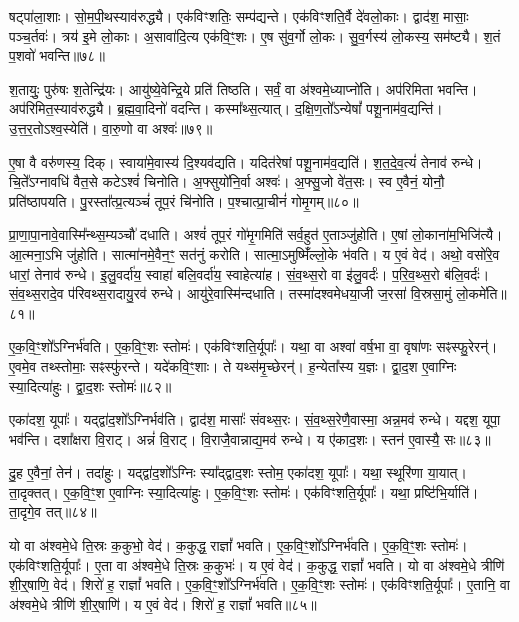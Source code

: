 षट्पा॑ला॒शाः।
सो॒म॒पी॒थस्याव॑रुद्ध्यै।
एक॑विꣳशतिः॒ सम्प॑द्यन्ते।
एक॑विꣳशति॒र्वै दे॑वलो॒काः।
द्वाद॑श॒ मासाः॒ पञ्च॒र्तवः॑।
त्रय॑ इ॒मे लो॒काः।
अ॒सावा॑दि॒त्य एक॑वि॒ꣳ॒शः।
ए॒ष सु॑व॒र्गो लो॒कः।
सु॒व॒र्गस्य॑ लो॒कस्य॒ सम॑ष्ट्यै।
श॒तं प॒शवो॑ भवन्ति॥७८॥

श॒तायुः॒ पुरु॑षः श॒तेन्द्रि॑यः।
आयु॑ष्ये॒वेन्द्रि॒ये प्रति॑ तिष्ठति।
सर्वं॒ वा अ॑श्वमे॒ध्याप्नो॑ति।
अप॑रिमिता भवन्ति।
अप॑रिमित॒स्याव॑रुद्ध्यै।
ब्र॒ह्म॒वा॒दिनो॑ वदन्ति।
कस्मा᳚थ्स॒त्यात्।
द॒क्षि॒ण॒तो᳚\-ऽन्येषां᳚ पशू॒ना\-म॑व॒\-द्यन्ति॑।
उ॒त्त॒र॒तो\-ऽश्व॒स्येति॑।
वा॒रु॒णो वा अश्वः॑॥७९॥

ए॒षा वै वरु॑णस्य॒ दिक्।
स्वाया॑मे॒वास्य॑ दि॒श्यव॑द्यति।
यदित॑रेषां पशू॒नाम॑व॒द्यति॑।
श॒त॒दे॒व॒त्यं॑ तेनाव॑ रुन्धे।
चि॒ते᳚\-ऽग्नावधि॑ वैत॒से कटे\-ऽश्वं॑ चिनोति।
अ॒फ्सुयो॑नि॒र्वा अश्वः॑।
अ॒फ्सु॒जो वे॑त॒सः।
स्व ए॒वैनं॒ योनौ॒ प्रति॑\-ष्ठापयति।
पु॒रस्ता᳚त्प्र॒त्यञ्चं॑ तूप॒रं चि॑नोति।
प॒श्चात्प्रा॒चीनं॑ गोमृ॒गम्॥८०॥

प्रा॒णा॒पा॒नावे॒वास्मि᳚न्थ्स॒म्यञ्चौ॑ दधाति।
अश्वं॑ तूप॒रं गो॑मृ॒गमिति॑ सर्व॒हुत॑ ए॒ताञ्जु॑होति।
ए॒षां लो॒काना॑म॒भिजि॑त्यै।
आ॒त्मना॒ऽभि जु॑\-होति।
सात्मा॑नमे॒वैन॒ꣳ॒ सत॑नुं करोति।
सात्मा॒\-ऽमुष्मिँ॑ल्लो॒के भ॑वति।
य ए॒वं वेद॑।
अथो॒ वसो॑रे॒व धारां॒ तेनाव॑ रुन्धे।
इ॒लु॒\-वर्दा॑य॒ स्वाहा॑ बलि॒वर्दा॑य॒ स्वाहेत्या॑ह।
सं॒व॒थ्स॒रो वा इ॑लु॒वर्दः॑।
प॒रि॒\-व॒थ्स॒रो ब॑लि॒वर्दः॑।
सं॒व॒थ्स॒रा\-दे॒व प॑रि\-वथ्स॒रा\-दायु॒रव॑ रुन्धे।
आयु॑\-रे॒वा\-स्मि॑न्दधाति।
तस्मा॑दश्वमेधया॒जी ज॒रसा॑ वि॒स्रसा॒मुं लो॒कमे॑ति॥८१॥\anuvakamend[तेज॒सो\-ऽव॑रुद्ध्यै भव॒न्त्यश्वो॑ गोमृ॒गमि॑लु॒वर्द॑श्च॒त्वारि॑ च]

ए॒क॒वि॒ꣳ॒शो᳚\-ऽग्निर्भ॑वति।
ए॒क॒वि॒ꣳ॒शः स्तोमः॑।
एक॑\-विꣳशति॒र्यूपाः᳚।
यथा॒ वा अश्वा॑ वर्\mbox{}ष॒भा वा॒ वृषा॑णः सꣴस्फु॒रेरन्॑।
ए॒वमे॒व तथ्स्तोमाः॒ सꣴस्फु॑रन्ते।
यदे॑कवि॒ꣳ॒शाः।
ते यथ्स॑मृ॒च्छेरन्॑।
ह॒न्येता᳚स्य य॒ज्ञः।
द्वा॒द॒श ए॒वाग्निः स्या॒दित्या॑हुः।
द्वा॒द॒शः स्तोमः॑॥८२॥

एका॑दश॒ यूपाः᳚।
यद्द्वा॑द॒शो᳚\-ऽग्निर्भव॑ति।
द्वाद॑श॒ मासाः᳚ संवथ्स॒रः।
सं॒व॒थ्स॒रेणै॒वास्मा॒ अन्न॒मव॑ रुन्धे।
यद्दश॒ यूपा॒ भव॑न्ति।
दशा᳚क्षरा वि॒राट्।
अन्नं॑ वि॒राट्।
वि॒राजै॒वान्नाद्य॒मव॑ रुन्धे।
य ए॑काद॒शः।
स्तन॑ ए॒वास्यै॒ सः॥८३॥

दु॒ह ए॒वैनां॒ तेन॑।
तदा॑हुः।
यद्द्वा॑द॒शो᳚\-ऽग्निः स्या᳚द्द्वाद॒शः स्तोम॒ एका॑दश॒ यूपाः᳚।
यथा॒ स्थूरि॑णा या॒यात्।
ता॒दृक्तत्।
ए॒क॒वि॒ꣳ॒श ए॒वाग्निः स्या॒दित्या॑हुः।
ए॒क॒वि॒ꣳ॒शः स्तोमः॑।
एक॑विꣳशति॒र्यूपाः᳚।
यथा॒ प्रष्टि॑भि॒र्याति॑।
ता॒दृगे॒व तत्॥८४॥

यो वा अ॑श्वमे॒धे ति॒स्रः क॒कुभो॒ वेद॑।
क॒कुद्ध॒ राज्ञां᳚ भवति।
ए॒क॒वि॒ꣳ॒शो᳚\-ऽग्निर्भ॑वति।
ए॒क॒वि॒ꣳ॒शः स्तोमः॑।
एक॑विꣳशति॒र्यूपाः᳚।
ए॒ता वा अ॑श्वमे॒धे ति॒स्रः क॒कुभः॑।
य ए॒वं वेद॑।
क॒कुद्ध॒ राज्ञां᳚ भवति।
यो वा अ॑श्वमे॒धे त्रीणि॑ शी॒र्॒षाणि॒ वेद॑।
शिरो॑ ह॒ राज्ञां᳚ भवति।
ए॒क॒वि॒ꣳ॒शो᳚\-ऽग्निर्भ॑वति।
ए॒क॒वि॒ꣳ॒शः स्तोमः॑।
एक॑विꣳशति॒र्यूपाः᳚।
ए॒तानि॒ वा अ॑श्वमे॒धे त्रीणि॑ शी॒र्॒षाणि॑।
य ए॒वं वेद॑।
शिरो॑ ह॒ राज्ञां᳚ भवति॥८५॥\anuvakamend[द्वा॒द॒शः स्तोमः॒ स ए॒व तच्छिरो॑ ह॒ राज्ञां᳚ भवति॒ षट् च॑]

